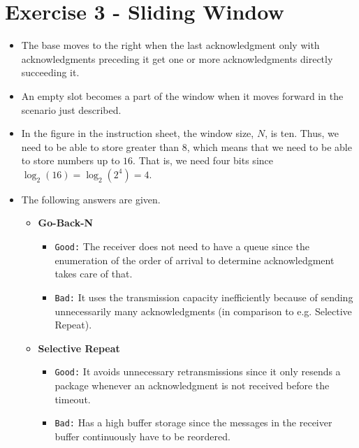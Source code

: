 \documentclass[10pt]{article}
\begin{document}
\section{Exercise 3 - Sliding Window}
\begin{itemize}
  \item The base moves to the right when the last acknowledgment only with acknowledgments preceding it get one or more acknowledgments directly succeeding it.
  \item An empty slot becomes a part of the window when it moves forward in the scenario just described.
  \item In the figure in the instruction sheet, the window size, $N$, is ten. Thus, we need to be able to store greater than $8$, which means that we need to be able to store numbers up to $16$. That is, we need four bits since $\log_2(16)=\log_2(2^4)=4$.
  \item The following answers are given.
  \begin{itemize}
    \item \textbf{Go-Back-N}
      \begin{itemize}
        \item \texttt{Good:} The receiver does not need to have a queue since the enumeration of the order of arrival to determine acknowledgment takes care of that.
        \item \texttt{Bad:} It uses the transmission capacity inefficiently because of sending unnecessarily many acknowledgments (in comparison to e.g. Selective Repeat).
      \end{itemize}
    \item \textbf{Selective Repeat}
      \begin{itemize}
        \item \texttt{Good:} It avoids unnecessary retransmissions since it only resends a package whenever an acknowledgment is not received before the timeout. 
        \item \texttt{Bad:} Has a high buffer storage since the messages in the receiver buffer continuously have to be reordered.
      \end{itemize}
  \end{itemize}
\end{itemize}
\end{document}
